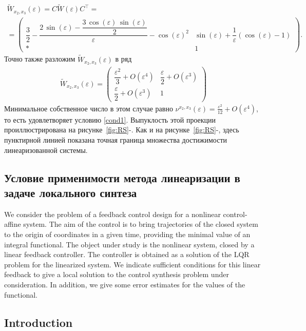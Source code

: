 \documentclass[../main.tex]{subfiles}
\begin{document}
\begin{enumerate}
\begin{gather*}
			\widetilde{W}_{x_2,x_3}(\varepsilon) =  C \widetilde{W} (\varepsilon) C^{\top}  =\\=\begin{pmatrix}
				\dfrac{3}{2}-\dfrac{2\,\sin\left(\varepsilon \right)-\dfrac{3\,\cos\left(\varepsilon \right)\,\sin\left(\varepsilon \right)}{2}}{\varepsilon }-{\cos\left(\varepsilon \right)}^2 & \sin\left(\varepsilon \right)+\dfrac{1}{\varepsilon } \left(\cos\left(\varepsilon \right)-1 \right)\\[8pt]
				* & 
				1 
			\end{pmatrix}.
		\end{gather*}
		Точно также разложим $ \widetilde{W}_{x_2,x_3}(\varepsilon) $ в ряд
		\begin{gather*}
			\widetilde{W}_{x_2,x_3}(\varepsilon)  = \begin{pmatrix}
				\dfrac{\varepsilon^2}{3} + O(\varepsilon^4) &
				\dfrac{\varepsilon }{2} + O(\varepsilon^3) \\[8pt]
				\dfrac{\varepsilon }{2} + O(\varepsilon^3) & 1
			\end{pmatrix}
		\end{gather*}
		Минимальное собственное число в этом случае равно $ \nu^{x_2,x_3}(\varepsilon) = \frac{\varepsilon^2}{12} + O(\varepsilon^4) $, то есть удовлетворяет условию \eqref{cond1}. Выпуклость этой проекции проиллюстрирована на рисунке~\ref{fig:RS}-.  Как и на рисунке~\ref{fig:RS}-, здесь пунктирной линией показана точная граница множества достижимости линеаризованной системы.
	\end{enumerate}
\subsection{Условие применимости метода линеаризации в задаче локального синтеза} 
We consider the problem of a feedback control design for a nonlinear control-affine system. The aim of the control is to bring  trajectories of the closed system to the origin of coordinates in a given time, providing the minimal value of an integral functional. The object under study is the nonlinear system, closed by a linear feedback controller. The controller is  obtained as a solution of the LQR problem for the linearized system. We indicate sufficient conditions  for this linear feedback to give a local solution to the control synthesis problem under consideration.  In addition, we give some  error estimates for the values of the functional. 

\subsection{Introduction}
\end{document}
